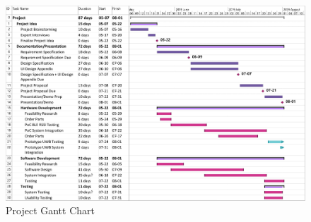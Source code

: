 \pagebreak
\thispagestyle{empty}
\begin{landscape}

\begin{figure}
\centering
    \includegraphics[width=\linewidth]{./images/gantt.jpg}
    \caption{Project Gantt Chart}
    \label{gantt}
\end{figure}
\restoregeometry
\end{landscape}




